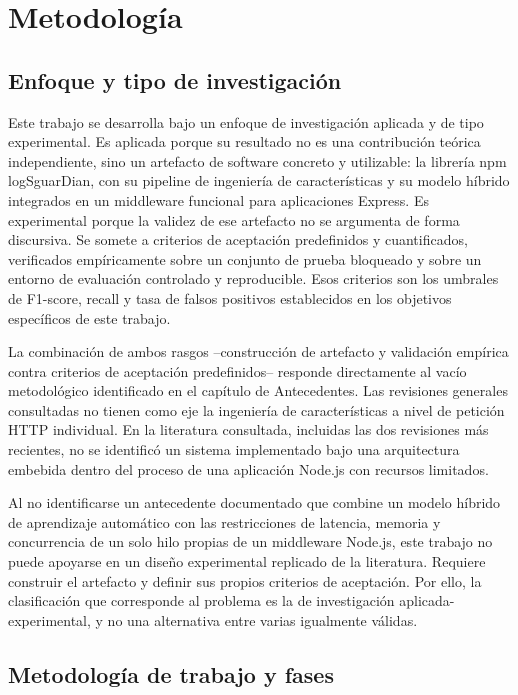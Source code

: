 \chapter{Metodología}

\section{Enfoque y tipo de investigación}

Este trabajo se desarrolla bajo un enfoque de investigación aplicada y de tipo experimental. Es aplicada porque su resultado no es una contribución teórica independiente, sino un artefacto de software concreto y utilizable: la librería npm logSguarDian, con su pipeline de ingeniería de características y su modelo híbrido integrados en un middleware funcional para aplicaciones Express. Es experimental porque la validez de ese artefacto no se argumenta de forma discursiva. Se somete a criterios de aceptación predefinidos y cuantificados, verificados empíricamente sobre un conjunto de prueba bloqueado y sobre un entorno de evaluación controlado y reproducible. Esos criterios son los umbrales de F1-score, recall y tasa de falsos positivos establecidos en los objetivos específicos de este trabajo.

La combinación de ambos rasgos --construcción de artefacto y validación empírica contra criterios de aceptación predefinidos-- responde directamente al vacío metodológico identificado en el capítulo de Antecedentes. Las revisiones generales consultadas no tienen como eje la ingeniería de características a nivel de petición HTTP individual. En la literatura consultada, incluidas las dos revisiones más recientes, no se identificó un sistema implementado bajo una arquitectura embebida dentro del proceso de una aplicación Node.js con recursos limitados.

Al no identificarse un antecedente documentado que combine un modelo híbrido de aprendizaje automático con las restricciones de latencia, memoria y concurrencia de un solo hilo propias de un middleware Node.js, este trabajo no puede apoyarse en un diseño experimental replicado de la literatura. Requiere construir el artefacto y definir sus propios criterios de aceptación. Por ello, la clasificación que corresponde al problema es la de investigación aplicada-experimental, y no una alternativa entre varias igualmente válidas.

\section{Metodología de trabajo y fases}

